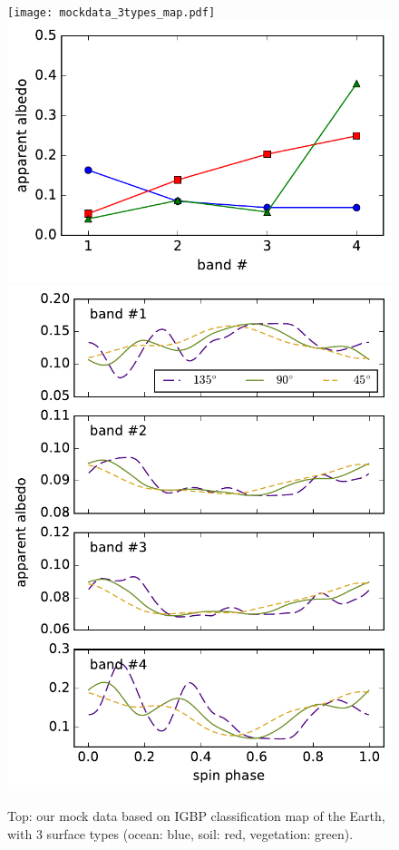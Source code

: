 \documentclass[iop,numberedappendix,apj,]{emulateapj}
\begin{document}
\begin{figure}[t]
    \begin{center}
	\texttt{[image: mockdata\_3types\_map.pdf]}
    \includegraphics[width=\hsize]{mockdata_3types_albd.pdf}
	\includegraphics[width=\hsize]{mockdata_3types_t360_lc.pdf}
    \end{center}
    \caption{Top: our mock data based on IGBP classification map of the Earth, with 3 surface types (ocean: blue, soil: red, vegetation: green). }
\label{fig:mockdata}
\end{figure}
\end{document}
